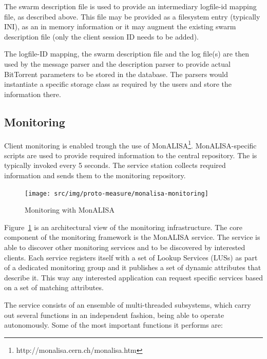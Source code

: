 The swarm description file is used to provide an intermediary logfile-id
mapping file, as described above. This file may be provided as a filesystem
entry (typically INI), as an in memory information or it may augment the
existing swarm description file (only the client session ID needs to be
added).

The logfile-ID mapping, the swarm description file and the log file(s) are
then used by the message parser and the description parser to provide actual
BitTorrent parameters to be stored in the database. The parsers would
instantiate a specific storage class as required by the users and store the
information there.

\subsection{Monitoring}

Client monitoring is enabled trough the use of
MonALISA\footnote{http://monalisa.cern.ch/monalisa.htm}. MonALISA-specific
scripts are used to provide required information to the central repository.
The is typically invoked every 5 seconds. The service station collects
required information and sends them to the monitoring repository.

\begin{figure}[h]
  \begin{center}
    \texttt{[image: src/img/proto-measure/monalisa-monitoring]}
  \end{center}
  \caption{Monitoring with MonALISA}
  \label{fig:proto-measure:monitoring}
\end{figure}

Figure~\ref{fig:proto-measure:monitoring} is an architectural view of the
monitoring infrastructure. The core component of the monitoring framework is
the MonALISA service. The service is able to discover other monitoring
services and to be discovered by interested clients. Each service registers
itself with a set of Lookup Services (LUSs) as part of a dedicated monitoring
group and it publishes a set of dynamic attributes that describe it. This way
any interested application can request specific services based on a set of
matching attributes.

The service consists of an ensemble of multi-threaded subsystems,
which carry out several functions in an independent fashion, being able to
operate autonomously. Some of the most important functions it
performs are:


